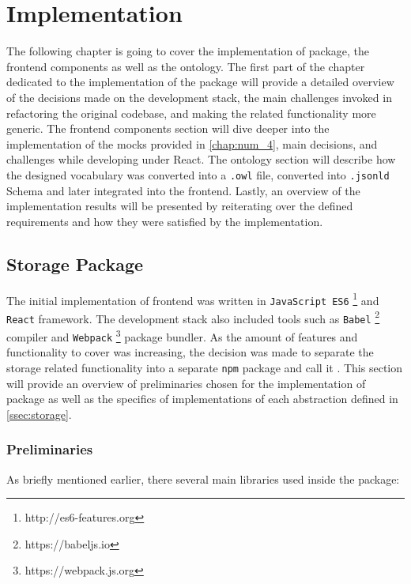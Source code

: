 \chapter{Implementation}
\label{chap:num_5}

The following chapter is going to cover the implementation of \lpas{} package, the frontend components as well as the ontology. The first part of the chapter dedicated to the implementation of the package will provide a detailed overview of the decisions made on the development stack, the main challenges invoked in refactoring the original \lpa{} codebase, and making the \solid{} related functionality more generic. The frontend components section will dive deeper into the implementation of the mocks provided in \autoref{chap:num_4}, main decisions, and challenges while developing under React. The ontology section will describe how the designed \lpas{} vocabulary was converted into a \texttt{.owl} file, converted into \texttt{.jsonld} Schema and later integrated into the \lpa{} frontend. Lastly, an overview of the implementation results will be presented by reiterating over the defined \lpa{} requirements and how they were satisfied by the implementation.
 
\section{Storage Package}

The initial implementation of \lpa{} frontend was written in \texttt{JavaScript ES6} \footnote{http://es6-features.org} and \texttt{React} framework. The development stack also included tools such as \texttt{Babel} \footnote{https://babeljs.io} compiler and \texttt{Webpack} \footnote{https://webpack.js.org} package bundler. As the amount of features and functionality to cover was increasing, the decision was made to separate the \solid{} storage related functionality into a separate \texttt{npm} package and call it \lpas{}. This section will provide an overview of preliminaries chosen for the implementation of \lpas{} package as well as the specifics of implementations of each abstraction defined in \autoref{ssec:storage}. 

\subsection{Preliminaries}

As briefly mentioned earlier, there several main libraries used inside the \lpas{} package:

